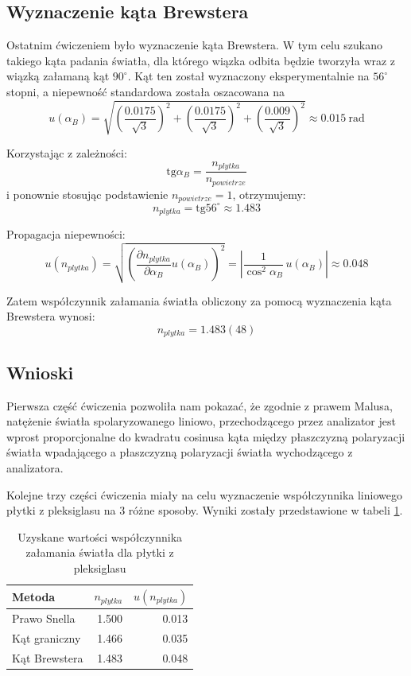 \documentclass[a4paper]{article}
\begin{document}
\subsection{Wyznaczenie kąta Brewstera}
Ostatnim ćwiczeniem było wyznaczenie kąta Brewstera.
W tym celu szukano takiego kąta padania światła, dla którego wiązka odbita będzie tworzyła wraz z wiązką załamaną kąt $90^\circ$.
Kąt ten został wyznaczony eksperymentalnie na $56^\circ$ stopni, a niepewność standardowa została oszacowana na \[
	u(\alpha_B) =\sqrt{ 
		  \left( \frac{0.0175}{\sqrt{3}} \right)^2 
		+ \left( \frac{0.0175}{\sqrt{3}} \right)^2
		+ \left( \frac{0.009}{\sqrt{3}} \right)^2
	}
	 \approx 0.015 \ \text{rad}
\]

Korzystając z zależności:
\[
	\text{tg}\alpha_B = \frac{n_{plytka}}{n_{powietrze}}
\]
i ponownie stosując podstawienie $n_{powietrze} = 1$, otrzymujemy:
\[
	n_{plytka} = \text{tg}56^\circ \approx 1.483
\]

Propagacja niepewności:
\[
	u(n_{plytka})
		= \sqrt{
			\left( \frac{\partial n_{plytka}}{\partial \alpha_B}u(\alpha_B)\right)^2
		}
		=	\left| \frac{1}{\cos^2 \alpha_B} \, u(\alpha_B) \right| 
		\approx 0.048
\]

Zatem współczynnik załamania światła obliczony za pomocą wyznaczenia kąta Brewstera wynosi:
\[
	n_{plytka} = 1.483(48)
\]
\subsection{Wnioski}
Pierwsza część ćwiczenia pozwoliła nam pokazać, że zgodnie z prawem Malusa, natężenie światła spolaryzowanego liniowo, przechodzącego przez analizator jest wprost proporcjonalne do kwadratu cosinusa kąta między płaszczyzną polaryzacji światła wpadającego a płaszczyzną polaryzacji światła wychodzącego z analizatora.

Kolejne trzy części ćwiczenia miały na celu wyznaczenie współczynnika liniowego płytki z pleksiglasu na 3 różne sposoby.
Wyniki zostały przedstawione w tabeli \ref{wnioski-wartości}.

\begin{table}[h!]
\centering
\begin{tabular}{lrr}
\toprule
Metoda & $n_{plytka}$ & $u(n_{plytka})$ \\
\midrule
Prawo Snella  & 1.500 & 0.013 \\
Kąt graniczny & 1.466 & 0.035 \\
Kąt Brewstera & 1.483 & 0.048 \\
\bottomrule
\end{tabular}
\caption{Uzyskane wartości współczynnika załamania światła dla płytki z pleksiglasu}
\label{wnioski-wartości}
\end{table}
\end{document}
